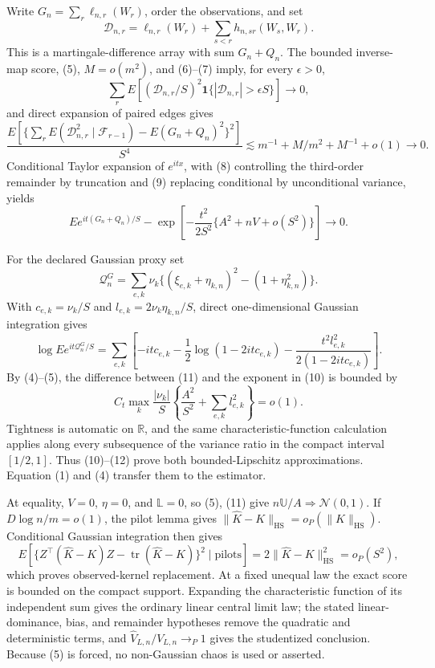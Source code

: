 Write \(G_n=\sum_r\ell_{n,r}(W_r)\), order the observations, and set
\[
\mathcal D_{n,r}=\ell_{n,r}(W_r)+\sum_{s<r}h_{n,sr}(W_s,W_r).
\]
This is a martingale-difference array with sum \(G_n+Q_n\). The bounded inverse-map score, (5), \(M=o(m^2)\), and (6)--(7) imply, for every \(\epsilon>0\),
\[
\sum_rE[(\mathcal D_{n,r}/S)^2\mathbf1\{|\mathcal D_{n,r}|>\epsilon S\}]\to0, \tag{8}
\]
and direct expansion of paired edges gives
\[
\frac{E[\{\sum_rE(\mathcal D_{n,r}^2\mid\mathcal F_{r-1})-E(G_n+Q_n)^2\}^2]}{S^4}
\lesssim m^{-1}+M/m^2+M^{-1}+o(1)\to0.                                \tag{9}
\]
Conditional Taylor expansion of \(e^{itx}\), with (8) controlling the third-order remainder by truncation and (9) replacing conditional by unconditional variance, yields
\[
E e^{it(G_n+Q_n)/S}
-\exp\!\left[-\frac{t^2}{2S^2}\{A^2+nV+o(S^2)\}\right]\to0.        \tag{10}
\]

For the declared Gaussian proxy set
\[
\mathcal Q_n^G=\sum_{e,k}\nu_k\{(\xi_{e,k}+\eta_{k,n})^2-(1+\eta_{k,n}^2)\}.
\]
With \(c_{e,k}=\nu_k/S\) and \(l_{e,k}=2\nu_k\eta_{k,n}/S\), direct one-dimensional Gaussian integration gives
\[
\log Ee^{it\mathcal Q_n^G/S}
=\sum_{e,k}\left[-itc_{e,k}-\frac12\log(1-2itc_{e,k})
-\frac{t^2l_{e,k}^2}{2(1-2itc_{e,k})}\right].                       \tag{11}
\]
By (4)--(5), the difference between (11) and the exponent in (10) is bounded by
\[
C_t\max_k\frac{|\nu_k|}{S}
\left\{\frac{A^2}{S^2}+\sum_{e,k}l_{e,k}^2\right\}=o(1).           \tag{12}
\]
Tightness is automatic on \(\mathbb R\), and the same characteristic-function calculation applies along every subsequence of the variance ratio in the compact interval \([1/2,1]\). Thus (10)--(12) prove both bounded-Lipschitz approximations. Equation (1) and (4) transfer them to the estimator.

At equality, \(V=0\), \(\eta=0\), and \(\mathbb L=0\), so (5), (11) give \(n\mathbb U/A\Rightarrow\mathcal N(0,1)\). If \(D\log n/m=o(1)\), the pilot lemma gives \(\|\widehat K-K\|_{\mathrm{HS}}=o_P(\|K\|_{\mathrm{HS}})\). Conditional Gaussian integration then gives
\[
E[\{Z^\top(\widehat K-K)Z-\operatorname{tr}(\widehat K-K)\}^2\mid\text{pilots}]
=2\|\widehat K-K\|_{\mathrm{HS}}^2=o_P(S^2),                       \tag{13}
\]
which proves observed-kernel replacement. At a fixed unequal law the exact score is bounded on the compact support. Expanding the characteristic function of its independent sum gives the ordinary linear central limit law; the stated linear-dominance, bias, and remainder hypotheses remove the quadratic and deterministic terms, and \(\widehat V_{L,n}/V_{L,n}\to_P1\) gives the studentized conclusion. Because (5) is forced, no non-Gaussian chaos is used or asserted.